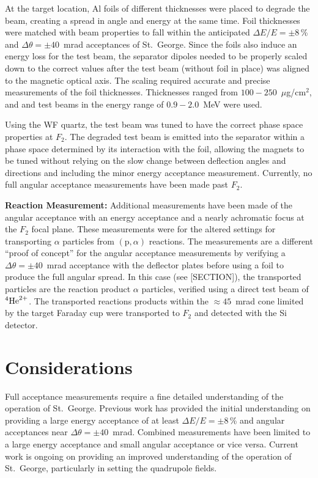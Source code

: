 At the target location, Al foils of different thicknesses were placed to
degrade the beam, creating a spread in angle and energy at the same
time. Foil thicknesses were matched with beam properties to fall within
the anticipated $\Delta E/E = \pm 8$\,\% and $\Delta\theta = \pm
40$~mrad acceptances of St.\ George. Since the foils also induce an
energy loss for the test beam, the separator dipoles needed to be
properly scaled down to the correct values after the test beam (without
foil in place) was aligned to the magnetic optical axis. The scaling
required accurate and precise measurements of the foil thicknesses.
Thicknesses ranged from $100-250$~$\mu$g/cm$^2$, and  and
 test beams in the energy range of $0.9-2.0$~MeV were used.

Using the WF quartz, the test beam was tuned to have the correct phase
space properties at $F_2$. The degraded test beam is emitted into the
separator within a phase space determined by its interaction with the
foil, allowing the magnets to be tuned without relying on the slow
change between deflection angles and directions and including the minor
energy acceptance measurement. Currently, no full angular acceptance
measurements have been made past $F_2$.


\textbf{Reaction Measurement:}
Additional measurements have been made of the angular acceptance with an
energy acceptance and a nearly achromatic focus at the $F_2$ focal
plane. These measurements were for the altered settings for transporting
$\alpha$ particles from $(\textrm{p},\alpha)$ reactions. The
measurements are a different ``proof of concept'' for the angular
acceptance measurements by verifying a $\Delta\theta = \pm 40$~mrad
acceptance with the deflector plates before using a foil to produce the
full angular spread. In this case (see [SECTION]), the transported
particles are the reaction product $\alpha$ particles, verified using a
direct test beam of ${}^{4}\textrm{He}^{2+}$. The transported reactions
products within the $\approx 45$~mrad cone limited by the target Faraday
cup were transported to $F_2$ and detected with the Si detector.


\section{Considerations}

Full acceptance measurements require a fine detailed understanding of
the operation of St.\ George. Previous work has provided the initial
understanding on providing a large energy acceptance of at least $\Delta
E/E = \pm 8$\,\% and angular acceptances near $\Delta\theta = \pm
40$~mrad. Combined measurements have been limited to a large energy
acceptance and small angular acceptance or vice versa. Current work is
ongoing on providing an improved understanding of the operation of St.\
George, particularly in setting the quadrupole fields.

